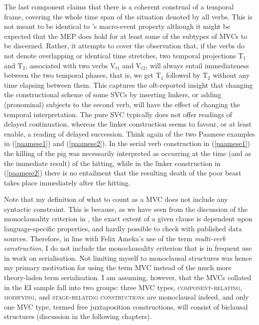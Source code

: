The last component claims that there is a coherent construal of a temporal frame, covering the whole time span of the situation denoted by all verbs. This is not meant to be identical to \citeauthor{bohnemeyer2007principles}'s macro-event property although it might be expected that the MEP does hold for at least some of the subtypes of MVCs to be discerned. Rather, it attempts to cover the observation that, if the verbs do not denote overlapping or identical time stretches, two temporal projections T$_1$ and T$_2$, associated with two verbs V$_{t1}$ and V$_{t2}$, will always entail immediateness between the two temporal phases, that is, we get T$_1$ followed by T$_2$ without any time elapsing between them. This captures the oft-reported insight that changing the constructional scheme of some SVCs by inserting linkers, or adding (pronominal) subjects to the second verb, will have the effect of changing the temporal interpretation. The pure SVC typically does not offer readings of delayed continuation, whereas the linker construction seems to favour, or at least enable, a reading of delayed succession. Think again of the two Paamese examples in (\ref{paamese1}) and (\ref{paamese2}). In the serial verb construction in (\ref{paamese1}) the killing of the pig was necessarily interpreted as occurring at the time (and as the immediate result) of the hitting, while in the linker construction in (\ref{paamese2}) there is no entailment that the resulting death of the poor beast takes place immediately after the hitting.

Note that my definition of what to count as a MVC does not include any syntactic constraint. This is because, as we have seen from the discussion of the monoclausality criterion in , the exact extent of a given clause is dependent upon language-specific properties, and hardly possible to check with published data sources. Therefore, in line with Felix Ameka's use of the term \textit{multi-verb construction}, I do not include the monoclausality criterion that is in frequent use in work on serialisation. Not limiting myself to monoclausal structures was hence my primary motivation for using the term MVC instead of the much more theory-laden term serialisation. I am assuming, however, that the MVCs collated in the EI sample fall into two groups: three MVC types, \textsc{component-relating}, \textsc{modifying}, and \textsc{stage-relating construction}s are monoclausal indeed, and only one MVC type, termed free juxtaposition constructions, will consist of biclausal structures (discussion in the following chapters). 

